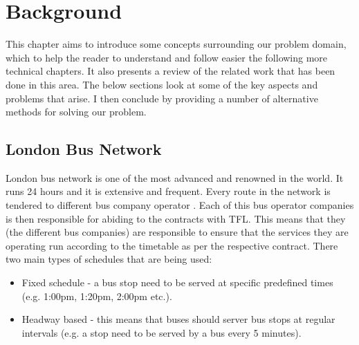 \chapter{Background}
This chapter aims to introduce some concepts surrounding our problem domain, which to help the reader to understand and follow easier the following more technical chapters. It also presents a review of the related work that has been done in this area. The below sections look at some of the key aspects and problems that arise. I then conclude by providing a number of alternative methods for solving our problem.

\section{London Bus Network}
London bus network is one of the most advanced and renowned in the world. It runs 24 hours and it is extensive and frequent. Every route in the network is tendered to different bus company operator \cite{busTendering}. Each of this bus operator companies is then responsible for abiding to the contracts with TFL. This means that they (the different bus companies) are responsible to ensure that the services they are operating run according to the timetable as per the respective contract. There two main types of schedules that are being used:
\begin{itemize}
	\item Fixed schedule - a bus stop need to be served at specific predefined times (e.g. 1:00pm, 1:20pm, 2:00pm etc.).
	\item Headway based - this means that buses should server bus stops at regular intervals (e.g. a stop need to be served by a bus every 5 minutes).
\end{itemize}

